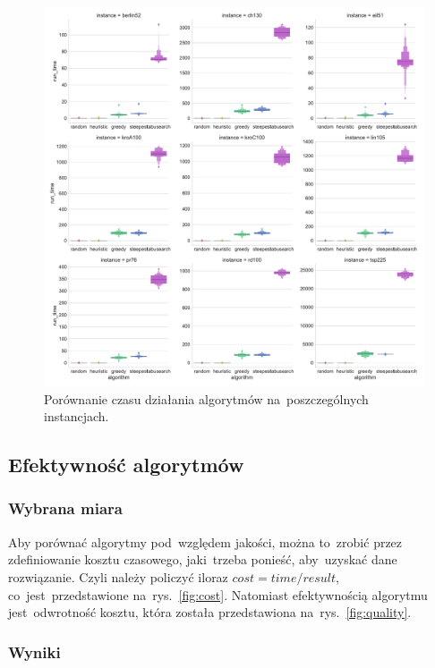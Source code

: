 \begin{figure}[H]
\begin{center}
\includegraphics[width=1.0\textwidth]{graphs/time_comparison_letval.pdf}
\end{center}
\caption{Porównanie czasu działania algorytmów na~poszczególnych instancjach.}
\label{fig:time}
\end{figure}

\subsection{Efektywność algorytmów}

\subsubsection{Wybrana miara}

Aby porównać algorytmy pod~względem jakości, można to~zrobić przez zdefiniowanie kosztu czasowego, jaki~trzeba ponieść, aby~uzyskać dane rozwiązanie. Czyli należy policzyć iloraz $cost = time / result$, co~jest~przedstawione na~rys.~\ref{fig:cost}. Natomiast efektywnością algorytmu jest~odwrotność kosztu, która została przedstawiona na~rys.~\ref{fig:quality}.

\subsubsection{Wyniki}

